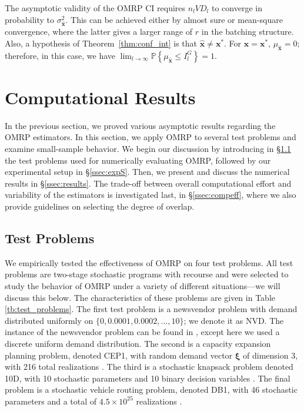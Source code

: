 \documentclass[12pt]{article}
\newcommand{\p}[1]{\mathbb{P} \left\{ #1 \right\}}
\newcommand{\x}{\mathbf{x}}
\newcommand{\xh}{{\hat{\x}}}
\newcommand{\xs}{\x^*}
\newcommand{\xit}{\boldsymbol{\xi}}
\begin{document}
The asymptotic validity of the OMRP CI requires $n_l VD_l$ to converge in probability to $\sigma^{2}_{\xh}$. 
This can be achieved either by almost sure or mean-square convergence, where the latter gives a larger range of $r$ in the batching structure.
Also, a hypothesis of Theorem~\ref{thm:conf_int} is that $\xh \neq \xs$.  
For $\xh = \xs$, $\mu_\xh = 0$; therefore, in this case, we have $\lim_{l\rightarrow\infty} \p{\mu_\xh \leq I^G_l} = 1$. 

\section{Computational Results}
\label{sec:comp}

In the previous section, we proved various asymptotic results regarding the OMRP estimators. 
In this section, we apply OMRP to several test problems and examine small-sample behavior. 
We begin our discussion by introducing in \S \ref{ssec:test} the test problems used for numerically evaluating OMRP, followed by our experimental setup in \S \ref{ssec:expS}. 
Then, we present and discuss the numerical results in \S \ref{ssec:results}.
The trade-off between overall computational effort and variability of the estimators is investigated last, in \S \ref{ssec:compeff}, where we also provide guidelines on selecting the degree of overlap. 

\subsection{Test Problems}
\label{ssec:test}


We empirically tested the effectiveness of OMRP on four test problems.
All test problems are two-stage stochastic programs with recourse and were selected to study the behavior of OMRP under a variety of different situations---we will discuss this below.
The characteristics of these problems are given in Table \ref{tb:test_problems}. 
The first test problem is a newsvendor problem with demand distributed uniformly on $\{0, 0.0001, 0.0002, \dots, 10\}$; we denote it as NVD.
The instance of the newsvendor problem can be found in \cite{Bayraksan2006}, except here we used a discrete uniform demand distribution.
The second is a capacity expansion planning problem, denoted CEP1, with random demand vector $\xit$ of dimension 3, with 216 total realizations \citep{higle1996}.
The third is a stochastic knapsack problem denoted 10D, with 10 stochastic parameters and 10 binary decision variables \citep{kleywegt2002sample}.
The final problem is a stochastic vehicle routing problem, denoted DB1, with 46 stochastic parameters and a total of $4.5 \times 10^{25}$ realizations \citep{donohue1995upper}.
\end{document}
